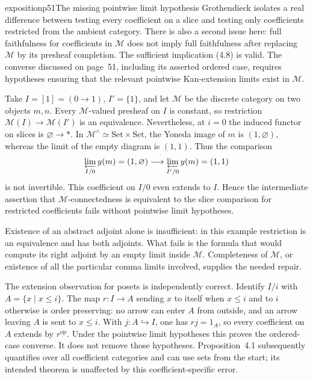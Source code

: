 \begin{dcomment}{exposition}{p51}{The missing pointwise limit hypothesis}
Grothendieck isolates a real difference between testing every coefficient on a slice and testing only coefficients restricted from the ambient category. There is also a second issue here: full faithfulness for coefficients in $\mathcal M$ does not imply full faithfulness after replacing $\mathcal M$ by its presheaf completion. The sufficient implication (4.8) is valid. The converse discussed on page~51, including its asserted ordered case, requires hypotheses ensuring that the relevant pointwise Kan-extension limits exist in $\mathcal M$.

Take $I=[1]=(0\longrightarrow1)$, $I'=\{1\}$, and let $\mathcal M$ be the discrete category on two objects $m,n$. Every $\mathcal M$-valued presheaf on $I$ is constant, so restriction $\mathcal M(I)\longrightarrow\mathcal M(I')$ is an equivalence. Nevertheless, at $i=0$ the induced functor on slices is $\varnothing\longrightarrow *$. In $\mathcal M^{\wedge}\simeq\mathrm{Set}\times\mathrm{Set}$, the Yoneda image of $m$ is $(1,\varnothing)$, whereas the limit of the empty diagram is $(1,1)$. Thus the comparison
\[
 \varprojlim_{I/0}y(m)=(1,\varnothing)
 \longrightarrow\varprojlim_{I'/0}y(m)=(1,1)
\]
is not invertible. This coefficient on $I/0$ even extends to $I$. Hence the intermediate assertion that $\mathcal M$-connectedness is equivalent to the slice comparison for restricted coefficients fails without pointwise limit hypotheses.

Existence of an abstract adjoint alone is insufficient: in this example restriction is an equivalence and has both adjoints. What fails is the formula that would compute its right adjoint by an empty limit inside $\mathcal M$. Completeness of $\mathcal M$, or existence of all the particular comma limits involved, supplies the needed repair.

The extension observation for posets is independently correct. Identify $I/i$ with $A=\{x\mid x\leq i\}$. The map $r:I\longrightarrow A$ sending $x$ to itself when $x\leq i$ and to $i$ otherwise is order preserving: no arrow can enter $A$ from outside, and an arrow leaving $A$ is sent to $x\leq i$. With $j:A\hookrightarrow I$, one has $rj=1_A$, so every coefficient on $A$ extends by $r^{\mathrm{op}}$. Under the pointwise limit hypotheses this proves the ordered-case converse. It does not remove those hypotheses. Proposition~4.1 subsequently quantifies over all coefficient categories and can use sets from the start; its intended theorem is unaffected by this coefficient-specific error.
\end{dcomment}


